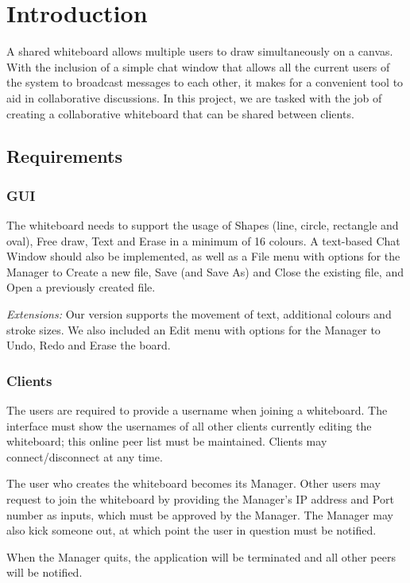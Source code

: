\chapter{Introduction}
A shared whiteboard allows multiple users to draw simultaneously on a canvas. With the inclusion of a simple chat window that allows all the current users of the system to broadcast messages to each other, it makes for a convenient tool to aid in collaborative discussions. In this project, we are tasked with the job of creating a collaborative whiteboard that can be shared between clients. 
\section{Requirements}
\subsection{GUI}
The whiteboard needs to support the usage of Shapes (line, circle, rectangle and oval), Free draw, Text and Erase in a minimum of 16 colours. A text-based Chat Window should also be implemented, as well as a File menu with options for the Manager to Create a new file, Save (and Save As) and Close the existing file, and Open a previously created file.


\noindent \textit{Extensions:} Our version supports the movement of text, additional colours and stroke sizes. We also included an Edit menu with options for the Manager to Undo, Redo and Erase the board.
\subsection{Clients}
The users are required to provide a username when joining a whiteboard. The interface must show the usernames of all other clients currently editing the whiteboard; this online peer list must be maintained. Clients may connect/disconnect at any time.

\noindent The user who creates the whiteboard becomes its Manager. Other users may request to join the whiteboard by providing the Manager's IP address and Port number as inputs, which must be approved by the Manager. The Manager may also kick someone out, at which point the user in question must be notified.

\noindent When the Manager quits, the application will be terminated and all other peers will be notified.
